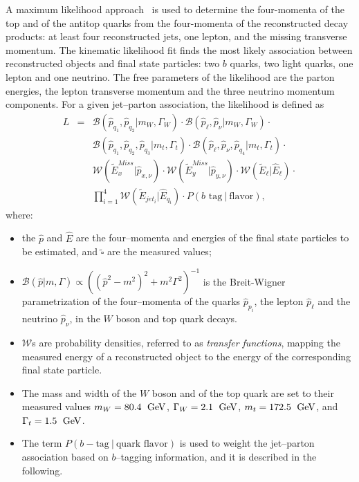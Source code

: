A maximum likelihood approach~\cite{klfitter} is used to determine the
four-momenta of the top and of the antitop quarks from the four-momenta of
the reconstructed decay products: at least four reconstructed jets, one lepton, and the
missing transverse momentum. The kinematic likelihood fit finds the
most likely association between reconstructed objects and \ttbar{} final state particles:
two $b$ quarks, two light quarks, one lepton and one neutrino.
The free parameters of the likelihood are the parton energies, the
lepton transverse momentum and the three neutrino momentum components.
For a given jet--parton association, the likelihood is defined as
\begin{eqnarray}
L & = & \mathcal{B}(\hat{p}_{q_1}, \hat{p}_{q_2} | m_W,  \Gamma_W)
      \cdot \mathcal{B}(\hat{p}_{\ell}, \hat{p}_{\nu} | m_W, \Gamma_W) \cdot \nonumber \\
           &   & \mathcal{B}(\hat{p}_{q_1}, \hat{p}_{q_2},\hat{p}_{q_3} | m_t, \Gamma_t)
                 \cdot \mathcal{B}(\hat{p}_{\ell}, \hat{p}_{\nu},\hat{p}_{q_4} | m_t, \Gamma_t) \cdot \nonumber \\
           &   & \mathcal{W}( \widetilde{E}_{x}^{Miss}| \hat{p}_{x, \nu})
                 \cdot \mathcal{W}(\widetilde{E}_{y}^{Miss} |    \hat{p}_{y, \nu})
                 \cdot \mathcal{W}(\widetilde{E}_{\ell} | \hat{E}_{\ell}) \cdot \nonumber \\
           &   & \prod_{i=1}^4 \mathcal{W}(\widetilde{E}_{jet_i} | \hat{E}_{q_i})
                 \cdot P(\textrm{$b$ tag} ~| ~\textrm{flavor}),
\label{eq:klflikelihood}
\end{eqnarray}
where:
\begin{itemize}
\item the $\hat{p}$ and $\hat{E}$ are the four--momenta and energies
  of the final state particles to be estimated, and
  $\widetilde{\square{}}$ are the measured values; 
\item $\mathcal{B}(\hat{p}|m,\Gamma)\propto((\hat{p}^2-m^2)^2+m^2\Gamma^2)^{-1}$ is
  the Breit-Wigner parametrization of the four--momenta of the quarks
  $\hat{p}_{p_i}$, the lepton $\hat{p}_{\ell}$ and the neutrino
  $\hat{p}_{\nu}$, in the $W$ boson and top quark decays.
\item $\mathcal{W}$s are probability densities, referred to as {\it
    transfer functions}, mapping the measured energy of a
  reconstructed object to the energy of the corresponding final state
  particle.
\item The mass and width of the $W$ boson and of the top quark are set
  to their measured values $m_W = 80.4~\; \mathrm{GeV}{}$, $\Gamma_W = 2.1~\; \mathrm{GeV}{}$, $m_t =
       172.5~\; \mathrm{GeV}{}$, and $\Gamma_t = 1.5~\; \mathrm{GeV}{}$. 
\item The term $P(b-\textrm{tag} ~| ~\textrm{quark flavor})$ is used
  to weight the jet--parton association based on $b$--tagging
  information, and it is described in the following.
\end{itemize}

